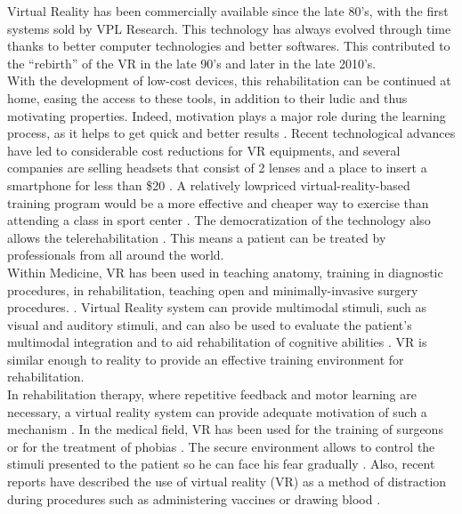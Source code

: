 \documentclass[12pt, openany, twocolumn]{article}
\begin{document}
Virtual Reality has been commercially available since the late 80's, with the first systems sold by VPL Research.
This technology has always evolved through time thanks to better computer technologies and better softwares.
This contributed to the ``rebirth'' of the VR in the late 90's \cite{burdeaVirtualRehabilitationBenefits2003} and later in the late 2010's.
\\

With the development of low-cost devices, this rehabilitation can be continued at home, easing the access to these tools, in addition to their ludic and thus motivating properties.
Indeed, motivation plays a major role during the learning process, as it helps to get quick and better results \cite{kangBenefitRetrievalPractice2014, christophelRelationshipsTeacherImmediacy1990, kinzieRequirementsBenefitsEffective1990b}.
Recent technological advances have led to considerable cost reductions for VR equipments, and several companies are selling headsets that consist of 2 lenses and a place to insert a smartphone for less than \$20 \cite{araneVirtualRealityPain2017}.
A relatively lowpriced virtual-reality-based training program would be a more effective and cheaper way to exercise than attending a class in sport center \cite{kimEffectsVRbasedWii2014}.
The democratization of the technology also allows the telerehabilitation \cite{burdeaVirtualRehabilitationBenefits2003}. This means a patient can be treated by professionals from all around the world. 
\\

Within Medicine, VR has been used in teaching anatomy, training in diagnostic procedures, in rehabilitation, teaching open and minimally-invasive surgery procedures.  \cite{burdeaVirtualRehabilitationBenefits2003}.
Virtual Reality system can provide multimodal stimuli, such as visual and auditory stimuli, and can also be used to evaluate the patient’s multimodal integration and to aid rehabilitation of cognitive abilities \cite{bioulacQuApportentOutils2018, morelAdvantagesLimitationsVirtual2015}. 
VR is similar enough to reality to provide an effective training environment for rehabilitation.
\\

In rehabilitation therapy, where repetitive feedback and motor learning are necessary, a virtual reality system can provide adequate motivation of such a mechanism \cite{kimEffectsVRbasedWii2014}.
In the medical field, VR has been used for the training of surgeons \cite{laverVirtualRealityStroke2017} or for the treatment of phobias \cite{morelAdvantagesLimitationsVirtual2015}. The secure environment allows to control the stimuli presented to the patient so he can face his fear gradually \cite{morelAdvantagesLimitationsVirtual2015}.
Also, recent reports have described the use of virtual reality (VR) as a method of distraction during procedures such as administering vaccines or drawing blood \cite{araneVirtualRealityPain2017}.
\\
\end{document}
